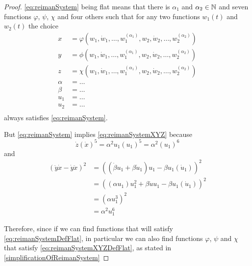 \documentclass[12pt]{article}
\begin{document}
\begin{proof}
\eqref{eq:reimanSystem} being flat means that there is $\alpha_1$ and $\alpha_2
\in \mathbb{N}$ and seven functions $\varphi$, $\psi$, $\chi$ and four others such that
for any two functions $w_1(t)$ and $w_2(t)$ the choice
\begin{equation} \label{eq:reimanSystemDefFlat}
  \begin{aligned}
    x &= \varphi( w_1, \dot{w}_1, \ldots, w_1^{(\alpha_1)}, w_2, \dot{w}_2, \ldots, w_2^{(\alpha_2)} ) \\
    y &= \phi( w_1, \dot{w}_1, \ldots, w_1^{(\alpha_1)}, w_2, \dot{w}_2, \ldots, w_2^{(\alpha_2)} ) \\
    z &= \chi( w_1, \dot{w}_1, \ldots, w_1^{(\alpha_1)}, w_2, \dot{w}_2, \ldots, w_2^{(\alpha_2)} ) \\
    \alpha &= \ldots \\
    \beta &= \ldots \\
    u_1 &= \ldots \\
    u_2 &= \ldots \\
  \end{aligned}
\end{equation}
always satisfies \eqref{eq:reimanSystem}.

But \eqref{eq:reimanSystem} implies \eqref{eq:reimanSystemXYZ} because
\[ \dot{z}(\dot{x})^5 = \alpha^2 u_1 (u_1)^5 = \alpha^2 (u_1)^6 \]
and
\begin{align*}
  ( \ddot{y}\dot{x} - \dot{y}\ddot{x} )^2
  &= ( (\dot{\beta}u_1 + \beta \dot{u}_1) u_1 - \beta u_1 (\dot{u}_1) )^2 \\
  &= ( (\alpha u_1) u_1^2 + \beta \dot{u} u_1 - \beta u_1 (\dot{u}_1) )^2 \\
  &= ( \alpha u_1^3 ) ^2 \\
  &= \alpha^2 u_1^6
\end{align*}

Therefore, since if we can find functions that will satisfy \eqref{eq:reimanSystemDefFlat},
in particular we can also find functions $\varphi$, $\psi$ and $\chi$ that satisfy
\eqref{eq:reimanSystemXYZDefFlat}, as stated in \ref{simplificationOfReimanSystem}
\end{proof}
\end{document}
